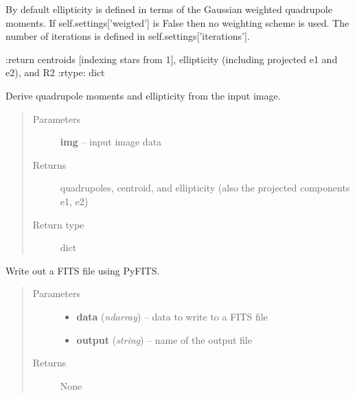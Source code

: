 \documentclass[a4paper,12pt,english]{sphinxmanual}
\begin{document}
\begin{fulllineitems}
\begin{fulllineitems}
By default ellipticity is defined in terms of the Gaussian weighted quadrupole moments.
If self.settings{[}'weigted'{]} is False then no weighting scheme is used.
The number of iterations is defined in self.settings{[}'iterations'{]}.

:return centroids {[}indexing stars from 1{]}, ellipticity (including projected e1 and e2), and R2
:rtype: dict

\end{fulllineitems}


\begin{fulllineitems}
\label{analysis:analysis.shape.shapeMeasurement.quadrupoles}
Derive quadrupole moments and ellipticity from the input image.
\begin{quote}\begin{description}
\item[{Parameters}] \leavevmode
\textbf{img} -- input image data

\item[{Returns}] \leavevmode
quadrupoles, centroid, and ellipticity (also the projected components e1, e2)

\item[{Return type}] \leavevmode
dict

\end{description}\end{quote}

\end{fulllineitems}


\begin{fulllineitems}
\label{analysis:analysis.shape.shapeMeasurement.writeFITS}
Write out a FITS file using PyFITS.
\begin{quote}\begin{description}
\item[{Parameters}] \leavevmode\begin{itemize}
\item {} 
\textbf{data} (\emph{ndarray}) -- data to write to a FITS file

\item {} 
\textbf{output} (\emph{string}) -- name of the output file

\end{itemize}

\item[{Returns}] \leavevmode
None

\end{description}\end{quote}

\end{fulllineitems}


\end{fulllineitems}
\end{document}
